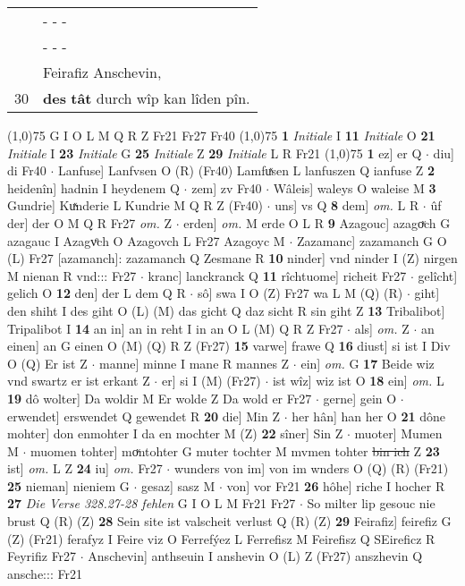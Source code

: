\documentclass[8pt,a4paper,notitlepage]{article}
\begin{document}
\begin{table}[ht]
\begin{minipage}[t]{0.5\linewidth}
\begin{tabular}{rl}
 & \multicolumn{1}{l}{ - - - }\\ 
 & \multicolumn{1}{l}{ - - - }\\ 
 & Feirafiz Anschevin,\\ 
30 & \textbf{des} \textbf{tât} durch wîp kan lîden pîn.\\ 
\end{tabular}
\scriptsize
\line(1,0){75} \newline
G I O L M Q R Z Fr21 Fr27 Fr40 \newline
\line(1,0){75} \newline
\textbf{1} \textit{Initiale} I  \textbf{11} \textit{Initiale} O  \textbf{21} \textit{Initiale} I  \textbf{23} \textit{Initiale} G  \textbf{25} \textit{Initiale} Z  \textbf{29} \textit{Initiale} L R Fr21  \newline
\line(1,0){75} \newline
\textbf{1} ez] er Q  $\cdot$ diu] di Fr40  $\cdot$ Lanfuse] Lanfvsen O (R) (Fr40) Lamfuͯsen L lanfuszen Q ianfuse Z \textbf{2} heidenîn] hadnin I heydenem Q  $\cdot$ zem] zv Fr40  $\cdot$ Wâleis] waleys O waleise M \textbf{3} Gundrie] Kuͯnderie L Kundrie M Q R Z (Fr40)  $\cdot$ uns] vs Q \textbf{8} dem] \textit{om.} L R  $\cdot$ ûf der] der O M Q R Fr27 \textit{om.} Z  $\cdot$ erden] \textit{om.} M erde O L R \textbf{9} Azagouc] azagoͮch G azagauc I Azagvͦch O Azagovch L Fr27 Azagoyc M  $\cdot$ Zazamanc] zazamanch G O (L) Fr27 [azamanch]: zazamanch Q Zesmane R \textbf{10} ninder] vnd ninder I (Z) nirgen M nienan R vnd::: Fr27  $\cdot$ kranc] lanckranck Q \textbf{11} rîchtuome] richeit Fr27  $\cdot$ gelîcht] gelich O \textbf{12} den] der L dem Q R  $\cdot$ sô] swa I O (Z) Fr27 wa L M (Q) (R)  $\cdot$ giht] den shiht I des giht O (L) (M) das gicht Q daz sicht R sin giht Z \textbf{13} Tribalibot] Tripalibot I \textbf{14} an in] an in reht I in an O L (M) Q R Z Fr27  $\cdot$ als] \textit{om.} Z  $\cdot$ an einen] an G einen O (M) (Q) R Z (Fr27) \textbf{15} varwe] frawe Q \textbf{16} diust] si ist I Div O (Q) Er ist Z  $\cdot$ manne] minne I mane R mannes Z  $\cdot$ ein] \textit{om.} G \textbf{17} Beide wiz vnd swartz er ist erkant Z  $\cdot$ er] si I (M) (Fr27)  $\cdot$ ist wîz] wiz ist O \textbf{18} ein] \textit{om.} L \textbf{19} dô wolter] Da woldir M Er wolde Z Da wold er Fr27  $\cdot$ gerne] gein O  $\cdot$ erwendet] erswendet Q gewendet R \textbf{20} die] Min Z  $\cdot$ her hân] han her O \textbf{21} dône mohter] don enmohter I da en mochter M (Z) \textbf{22} sîner] Sin Z  $\cdot$ muoter] Mumen M  $\cdot$ muomen tohter] moͮntohter G muter tochter M mvmen tohter \sout{bin ich} Z \textbf{23} ist] \textit{om.} L Z \textbf{24} iu] \textit{om.} Fr27  $\cdot$ wunders von im] von im wnders O (Q) (R) (Fr21) \textbf{25} nieman] nieniem G  $\cdot$ gesaz] sasz M  $\cdot$ von] vor Fr21 \textbf{26} hôhe] riche I hocher R \textbf{27} \textit{Die Verse 328.27-28 fehlen} G I O L M Fr21 Fr27   $\cdot$ So milter lip gesouc nie brust Q (R) (Z) \textbf{28} Sein site ist valscheit verlust Q (R) (Z) \textbf{29} Feirafiz] feirefiz G (Z) (Fr21) ferafyz I Feire viz O Ferrefýez L Ferrefisz M Feirefisz Q SEireficz R Feyrifiz Fr27  $\cdot$ Anschevin] anthseuin I anshevin O (L) Z (Fr27) anszhevin Q ansche::: Fr21 \newline

\end{minipage}
\end{table}
\end{document}
